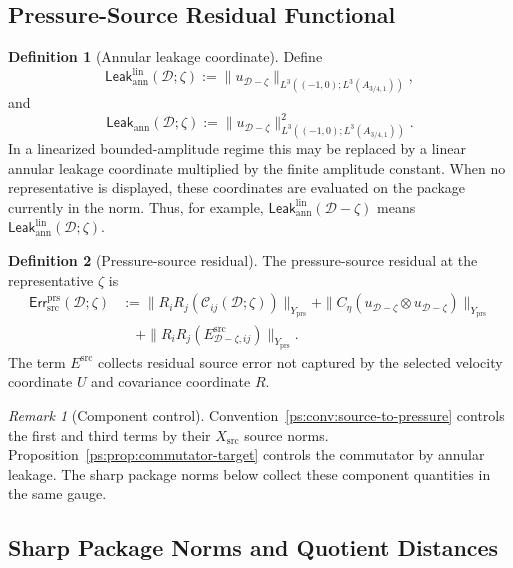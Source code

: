 \documentclass[11pt]{article}
\numberwithin{equation}{section}
\theoremstyle{definition}
\newtheorem{definition}[definition]{Definition}
\theoremstyle{remark}
\newtheorem{remark}[remark]{Remark}
\newcommand{\prs}{\mathrm{prs}}
\newcommand{\src}{\mathrm{src}}
\newcommand{\Err}{\mathsf{Err}}
\newcommand{\Leak}{\mathsf{Leak}}
\newcommand{\calD}{\mathcal D}
\newcommand{\Xsrc}{X_{\src}}
\newcommand{\Yprs}{Y_{\prs}}
\begin{document}
\subsection{Pressure-Source Residual Functional}
\label{ps:sec:residual-functional}

\begin{definition}[Annular leakage coordinate]
\label{ps:def:annular-leakage}
Define
\[
    \Leak_{\mathrm{ann}}^{\mathrm{lin}}(\calD;\zeta)
    :=
    \|u_{\calD-\zeta}\|_{L^3((-1,0);L^3(A_{3/4,1}))},
\]
and
\[
    \Leak_{\mathrm{ann}}(\calD;\zeta)
    :=
    \|u_{\calD-\zeta}\|_{L^3((-1,0);L^3(A_{3/4,1}))}^2.
\]
In a linearized bounded-amplitude regime this may be replaced by a linear
annular leakage coordinate multiplied by the finite amplitude constant.
When no representative is displayed, these coordinates are evaluated on the
package currently in the norm.  Thus, for example,
\(\Leak_{\mathrm{ann}}^{\mathrm{lin}}(\calD-\zeta)\) means
\(\Leak_{\mathrm{ann}}^{\mathrm{lin}}(\calD;\zeta)\).
\end{definition}

\begin{definition}[Pressure-source residual]
\label{ps:def:pressure-source-residual}
The pressure-source residual at the representative \(\zeta\) is
\[
\begin{aligned}
    \Err^{\prs}_{\src}(\calD;\zeta)
    &:=
    \|R_iR_j(\mathcal C_{ij}(\calD;\zeta))\|_{\Yprs}
    +
    \|C_\eta(u_{\calD-\zeta}\otimes u_{\calD-\zeta})\|_{\Yprs}
\\
    &\quad+
    \|R_iR_j(E^{\src}_{\calD-\zeta,ij})\|_{\Yprs}.
\end{aligned}
\]
The term \(E^{\src}\) collects residual source error not captured by the
selected velocity coordinate \(U\) and covariance coordinate \(R\).
\end{definition}

\begin{remark}[Component control]
Convention~\ref{ps:conv:source-to-pressure} controls the first and third terms by their
\(\Xsrc\) source norms.  Proposition~\ref{ps:prop:commutator-target} controls the
commutator by annular leakage.  The sharp package norms below collect these
component quantities in the same gauge.
\end{remark}

\subsection{Sharp Package Norms and Quotient Distances}
\label{ps:sec:sharp-norms}
\end{document}
